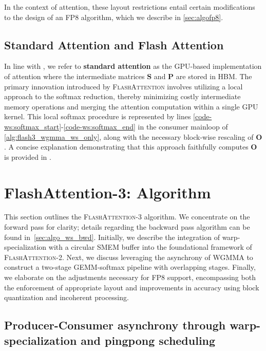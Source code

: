 In the context of attention, these layout restrictions entail certain modifications to the design of an FP8 algorithm, which we describe in \cref{sec:algofp8}.

\subsection{Standard Attention and Flash Attention} In line with \citet{dao2022flashattention}, we refer to \textbf{standard attention} as the GPU-based implementation of attention where the intermediate matrices $\mathbf{S}$ and $\mathbf{P}$ are stored in HBM. The primary innovation introduced by \textsc{FlashAttention} involves utilizing a local approach to the softmax reduction, thereby minimizing costly intermediate memory operations and merging the attention computation within a single GPU kernel. This local softmax procedure is represented by lines \ref{code-ws:softmax_start}-\ref{code-ws:softmax_end} in the consumer mainloop of \cref{alg:flash3_wgmma_ws_only}, along with the necessary block-wise rescaling of $\mathbf{O}$. A concise explanation demonstrating that this approach faithfully computes $\mathbf{O}$ is provided in \cite[\S 2.3.1]{dao2023flashattention2}.

\section{FlashAttention-3: Algorithm}
\label{sec:algo}

This section outlines the \textsc{FlashAttention-3} algorithm. We concentrate on the forward pass for clarity; details regarding the backward pass algorithm can be found in~\cref{sec:algo_ws_bwd}. Initially, we describe the integration of warp-specialization with a circular SMEM buffer into the foundational framework of \textsc{FlashAttention-2}. Next, we discuss leveraging the asynchrony of WGMMA to construct a two-stage GEMM-softmax pipeline with overlapping stages. Finally, we elaborate on the adjustments necessary for FP8 support, encompassing both the enforcement of appropriate layout and improvements in accuracy using block quantization and incoherent processing.

\subsection{Producer-Consumer asynchrony through warp-specialization and pingpong scheduling}
\label{sec:algo_ws}

